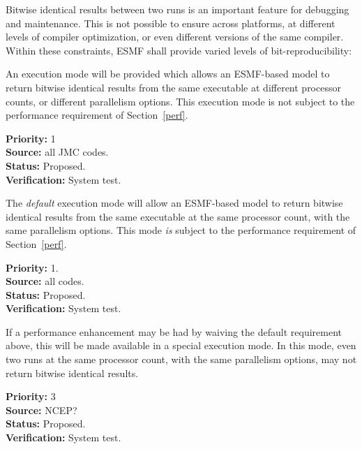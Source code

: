 
Bitwise identical results between two runs is an important feature for
debugging and maintenance. This is not possible to ensure across
platforms, at different levels of compiler optimization, or even
different versions of the same compiler. Within these constraints,
ESMF shall provide varied levels of bit-reproducibility:


An execution mode will be provided which allows an ESMF-based model to
return bitwise identical results from the same executable at different
processor counts, or different parallelism options. This execution
mode is not subject to the performance requirement of Section~\ref{perf}.

\begin{reqlist}
{\bf Priority:} 1 \\
{\bf Source:} all JMC codes. \\
{\bf Status:} Proposed. \\
{\bf Verification:} System test.
\end{reqlist}


The \emph{default} execution mode will allow an ESMF-based model to
return bitwise identical results from the same executable at the same
processor count, with the same parallelism options. This mode
\emph{is} subject to the performance requirement of
Section~\ref{perf}.

\begin{reqlist}
{\bf Priority:} 1.\\
{\bf Source:} all codes. \\
{\bf Status:} Proposed. \\
{\bf Verification:} System test.
\end{reqlist}


If a performance enhancement may be had by waiving the default
requirement above, this will be made available in a special execution
mode. In this mode, even two runs at the same processor count, with
the same parallelism options, may not return bitwise identical
results.

\begin{reqlist}
{\bf Priority:} 3 \\
{\bf Source:} NCEP? \\
{\bf Status:} Proposed. \\
{\bf Verification:} System test.
\end{reqlist}

